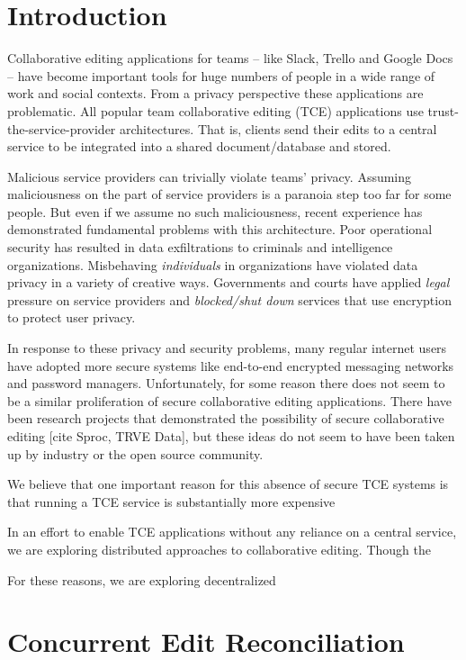 \documentclass[runningheads]{llncs}
\begin{document}
\section{Introduction}

Collaborative editing applications for teams -- like Slack, Trello and Google Docs -- have become important tools for huge numbers of people in a wide range of work and social contexts.
From a privacy perspective these applications are problematic.
All popular team collaborative editing (TCE) applications use trust-the-service-provider architectures.
That is, clients send their edits to a central service to be integrated into a shared document{\slash}database and stored.

Malicious service providers can trivially violate teams' privacy.
Assuming maliciousness on the part of service providers is a paranoia step too far for some people.
But even if we assume no such maliciousness, recent experience has demonstrated fundamental problems with this architecture.
Poor operational security has resulted in data exfiltrations to criminals and intelligence organizations.
Misbehaving \emph{individuals} in organizations have violated data privacy in a variety of creative ways.
Governments and courts have applied \emph{legal} pressure on service providers and \emph{blocked{\slash}shut down} services that use encryption to protect user privacy.

In response to these privacy and security problems, many regular internet users have adopted more secure systems like end-to-end encrypted messaging networks and password managers.
Unfortunately, for some reason there does not seem to be a similar proliferation of secure collaborative editing applications.
There have been research projects that demonstrated the possibility of secure collaborative editing [cite Sproc, TRVE Data], but these ideas do not seem to have been taken up by industry or the open source community.

We believe that one important reason for this absence of secure TCE systems is that running a TCE service is substantially more expensive 

In an effort to enable TCE applications without any reliance on a central service, we are exploring distributed approaches to collaborative editing.
Though the

For these reasons, we are exploring decentralized

\section{Concurrent Edit Reconciliation}
\end{document}
